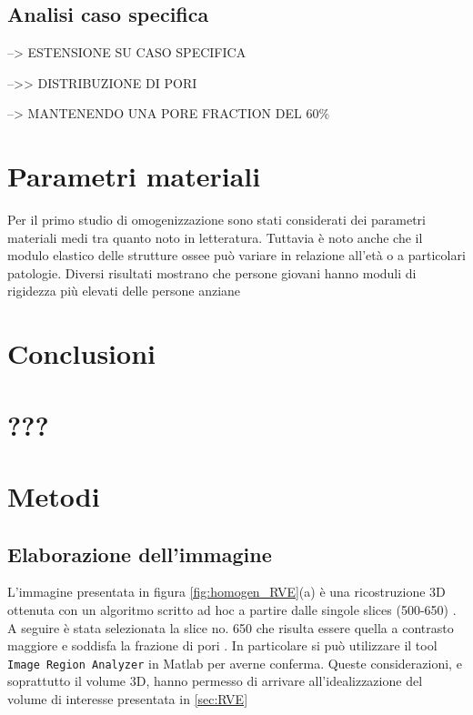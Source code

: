 \documentclass[a4paper,num-refs]{oup-contemporary}
\begin{document}
\subsection{Analisi caso specifica}


--> ESTENSIONE SU CASO SPECIFICA 

-->> DISTRIBUZIONE DI PORI 

--> MANTENENDO UNA PORE FRACTION DEL 60\%

\section{Parametri materiali}
\label{sec:variazioni_materiali}



Per il primo studio di omogenizzazione sono stati considerati dei parametri materiali medi tra quanto noto in letteratura. Tuttavia è noto anche che il modulo elastico delle strutture ossee può variare in relazione all'età o a particolari patologie. Diversi risultati mostrano che persone giovani hanno moduli di rigidezza più elevati delle persone anziane \citep{Cowin1}




\section{Conclusioni}

\section{???}


\section{Metodi}

\subsection{Elaborazione dell'immagine}

L'immagine presentata in figura \ref{fig:homogen_RVE}(a) è una ricostruzione 3D ottenuta con un algoritmo scritto ad hoc \citep{Mastrofini:21} a partire dalle singole slices (500-650) \citep{ESA:2005}. A seguire è stata selezionata la slice no. 650 che risulta essere quella a contrasto maggiore e soddisfa la frazione di pori \citep{CC21}. In particolare si può utilizzare il tool 
\texttt{Image Region Analyzer} in Matlab per averne conferma. Queste considerazioni, e soprattutto il volume 3D, hanno permesso di arrivare all'idealizzazione del volume di interesse presentata in  \cref{sec:RVE}
\end{document}

